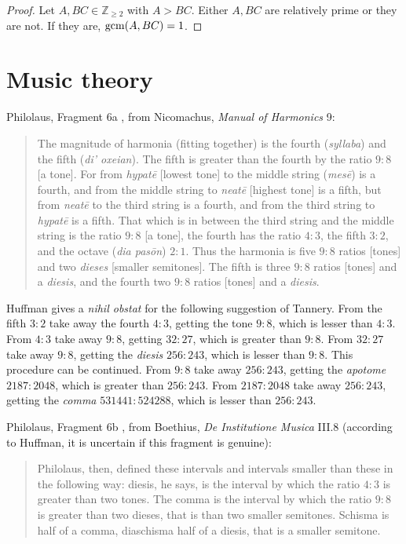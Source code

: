 \documentclass{article}
\newcommand{\gcm}{\ensuremath\mathrm{gcm}}
\begin{document}
\begin{proof}
Let $A,BC \in \mathbb{Z}_{\geq 2}$ with $A>BC$.
Either $A,BC$ are relatively prime or they are not. If they are,
$\gcm(A,BC)=1$. 
\end{proof}






\section{Music theory}
Philolaus, Fragment 6a  \cite[pp.~146--147]{philolaus},  from Nicomachus, {\em Manual of Harmonics} 9:

\begin{quote}
The magnitude of harmonia (fitting together) is the fourth ({\em syllaba}) and the fifth ({\em di' oxeian}). The fifth is greater than the fourth
by the ratio $9:8$ [a tone]. For from {\em hypat\={e}} [lowest tone] to the middle string ({\em mes\={e}}) is a fourth, and from the middle string to {\em neat\={e}} [highest tone] is a
fifth, but from {\em neat\={e}} to the third string is a fourth, and from the third string to {\em hypat\={e}} is a fifth. That which is in between the third string and the middle string is the
ratio $9:8$ [a tone], the fourth has the ratio $4:3$, the fifth $3:2$, and the octave ({\em dia pas\={o}n}) $2:1$. Thus the harmonia is five $9:8$ ratios [tones] and two {\em dieses}
 [smaller semitones]. The fifth is three $9:8$ ratios [tones] and a {\em diesis}, and the fourth two $9:8$ ratios [tones] and a {\em diesis}.
\end{quote}

Huffman \cite[p.~164]{philolaus} gives a {\em nihil obstat} for the following suggestion of Tannery. 
From the fifth $3:2$ take away the fourth $4:3$, getting the tone $9:8$, which is lesser than $4:3$.
From $4:3$ take away $9:8$, getting $32:27$, which is greater than $9:8$. From
$32:27$ take away $9:8$, getting the {\em diesis} $256:243$, which is lesser than $9:8$. This procedure can be continued.
From $9:8$ take away $256:243$, getting the {\em apotome} $2187:2048$, which is greater than $256:243$. From
$2187:2048$ take away $256:243$, getting the {\em comma} $531441:524288$, which is lesser than $256:243$. 

Philolaus, Fragment 6b \cite[p.~364]{philolaus}, from Boethius, {\em De Institutione Musica} III.8 (according to Huffman, it is uncertain if this fragment is genuine):

\begin{quote}
Philolaus, then, defined these intervals and intervals smaller than these in the following way: diesis, he says, is the interval by which the ratio
$4:3$ is greater than two tones. The comma is the interval by which the ratio $9:8$ is greater than two dieses, that is than two smaller semitones. Schisma is half of a comma,
 diaschisma half of a diesis, that is a smaller semitone.
\end{quote}
\end{document}
